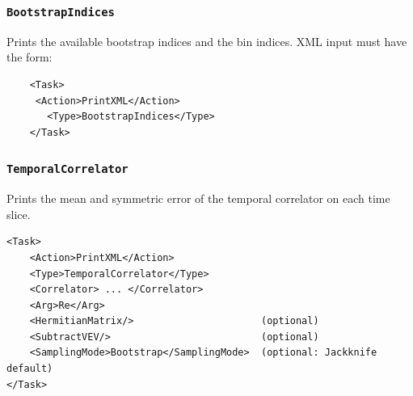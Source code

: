 \documentclass[12pt]{article}
\newcommand{\vb}{\texttt}
\begin{document}
\subsubsection{\vb{BootstrapIndices}}
Prints the available bootstrap indices and the bin indices.  XML input
must have the form:
\begin{verbatim}
    <Task> 
     <Action>PrintXML</Action>
       <Type>BootstrapIndices</Type>
    </Task>
\end{verbatim}
\subsubsection{\vb{TemporalCorrelator}}
Prints the mean and symmetric error of the temporal correlator on each time slice.
\begin{verbatim}
<Task>
    <Action>PrintXML</Action>
    <Type>TemporalCorrelator</Type>
    <Correlator> ... </Correlator>
    <Arg>Re</Arg>
    <HermitianMatrix/>                      (optional)
    <SubtractVEV/>                          (optional)
    <SamplingMode>Bootstrap</SamplingMode>  (optional: Jackknife default)
</Task>
\end{verbatim}
\end{document}
